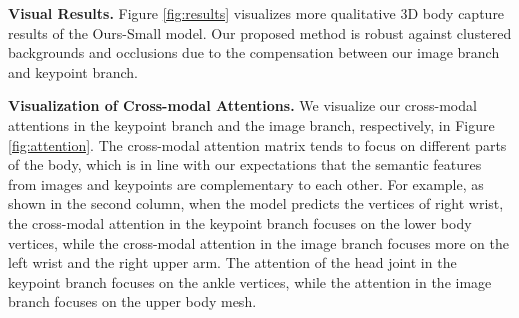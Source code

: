 \documentclass{article}
\newcommand\mypara[1]{\noindent\textbf{#1}}
\begin{document}
\begin{table}[h]
\renewcommand{\tabcolsep}{0.5pt}
\centering
{}
\caption{ Ablation study on consistency loss on 3DPW dataset. KB, IB denote Ours Keypoint Output and Ours Image Output (see Table 3 in the main paper), respectively.
}
\label{tbl:supp_ablation_consistency}
\end{table}


\mypara{Visual Results.}
Figure \ref{fig:results} visualizes more qualitative 3D body capture results of the Ours-Small model. Our proposed method is robust against clustered backgrounds and occlusions due to the compensation between our image branch and keypoint branch. 


\mypara{Visualization of Cross-modal Attentions.} 
We visualize our cross-modal attentions in the keypoint branch and the image branch, respectively, in Figure \ref{fig:attention}. 
The cross-modal attention matrix tends to focus on different parts of the body, which is in line with our expectations that the semantic features from images and keypoints are complementary to each other. 
For example, as shown in the second column, when the model predicts the vertices of right wrist, the cross-modal attention in the keypoint branch focuses on the lower body vertices, while the cross-modal attention in the image branch focuses more on the left wrist and the right upper arm. The attention of the head joint in the keypoint branch focuses on the ankle vertices, while the attention in the image branch focuses on the upper body mesh.
\end{document}
